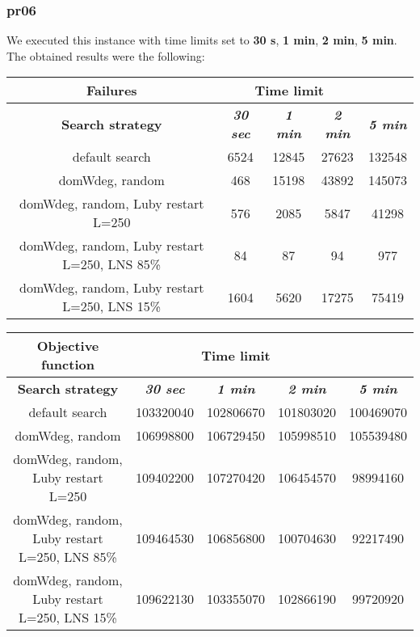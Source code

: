 \subsubsection{pr06}
We executed this instance with time limits set to \textbf{30 s}, \textbf{1 min}, \textbf{2 min}, \textbf{5 min}.\\
The obtained results were the following:
{
\renewcommand{\arraystretch}{2}
\begin{longtable}[h]{| c | c | c | c | c |}
    \hline
    \textbf{Failures} & \multicolumn{3}{c}{Time limit} & \\
    \hline
    \textbf{Search strategy} & \textbf{\textit{30 sec}} & \textbf{\textit{1 min}} & \textbf{\textit{2 min}} & \textbf{\textit{5 min}} \\
    \hline
    \endhead
    default search                                & 6524 & 12845 &  27623 & 132548 \\
    \hline
    domWdeg, random                               &  468 & 15198 &  43892 & 145073 \\
    \hline
    domWdeg, random, Luby restart L=250           &  576 &  2085 &   5847 &  41298 \\
    \hline
    domWdeg, random, Luby restart L=250, LNS 85\% &   84 &    87 &     94 &    977 \\
    \hline
    domWdeg, random, Luby restart L=250, LNS 15\% & 1604 &  5620 &  17275 &  75419 \\
    \hline
\end{longtable}
}

{
\renewcommand{\arraystretch}{2}
\begin{longtable}[h]{| c | c | c | c | c |}
    \hline
    \textbf{Objective function} & \multicolumn{3}{c}{Time limit} & \\
    \hline
    \textbf{Search strategy} & \textbf{\textit{30 sec}} & \textbf{\textit{1 min}} & \textbf{\textit{2 min}} & \textbf{\textit{5 min}} \\
    \hline
    \endhead
    default search                                & 103320040 & 102806670 & 101803020 & 100469070 \\
    \hline
    domWdeg, random                               & 106998800 & 106729450 & 105998510 & 105539480 \\
    \hline
    domWdeg, random, Luby restart L=250           & 109402200 & 107270420 & 106454570 &  98994160 \\
    \hline
    domWdeg, random, Luby restart L=250, LNS 85\% & 109464530 & 106856800 & 100704630 &  92217490 \\
    \hline
    domWdeg, random, Luby restart L=250, LNS 15\% & 109622130 & 103355070 & 102866190 &  99720920 \\
    \hline
\end{longtable}
}